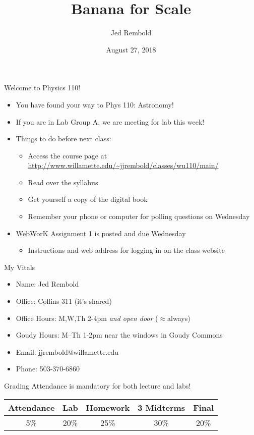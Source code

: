 \documentclass[pdf,aspectratio=169]{beamer}
\title{Banana for Scale}
\date{August 27, 2018}
\author{Jed Rembold}
\begin{document}
\begin{frame}{Welcome to Physics 110!}
  \begin{itemize}
	\item You have found your way to Phys 110: Astronomy!
	\item If you are in Lab Group A, we \alert{are} meeting for lab this week!
	\item Things to do before next class:
	  \begin{itemize}
		  \item Access the course page at \url{http://www.willamette.edu/~jjrembold/classes/wu110/main/}
		\item Read over the syllabus
		\item Get yourself a copy of the digital book
		\item Remember your phone or computer for polling questions on Wednesday
	  \end{itemize}
	\item WebWorK Assignment 1 is posted and due Wednesday
		\begin{itemize}
			\item Instructions and web address for logging in on the class website
		\end{itemize}
  \end{itemize}
\end{frame}

\begin{frame}{My Vitals}
  \begin{itemize}
	\item Name: Jed Rembold
	\item Office: Collins 311 (it's shared)
	\item Office Hours: M,W,Th 2-4pm \emph{and open door} ($\approx$always)
	\item Goudy Hours: M--Th 1-2pm near the windows in Goudy Commons
	\item Email: jjrembold@willamette.edu
	\item Phone: 503-370-6860
  \end{itemize}
\end{frame}

\begin{frame}{Grading}
  Attendance is mandatory for both lecture and labs!
  \begin{table}
	\centering
	\small
	\begin{tabular}{ccccc}
	  \toprule
	  Attendance & Lab & Homework & 3 Midterms & Final \\
	  \midrule
	  5\% & 20\% & 25\% & 30\% & 20\% \\
	  \bottomrule
	\end{tabular}
  \end{table}
\end{frame}
\end{document}
